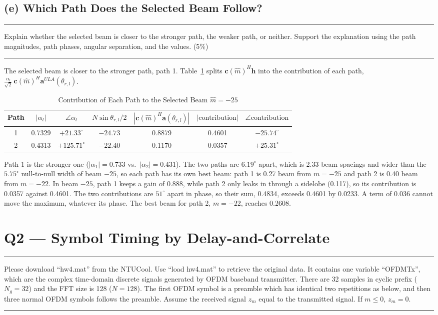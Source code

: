 \documentclass[12pt,a4paper]{report}
\newcommand{\question}[1]{%
    \hrule
    \vspace{0.2cm}
    #1
    \vspace{0.2cm}
    \hrule
    \vspace{0.5cm}
}
\begin{document}
\section{(e) Which Path Does the Selected Beam Follow?}

\question{Explain whether the selected beam is closer to the stronger path, the weaker path, or neither. Support the
explanation using the path magnitudes, path phases, angular separation, and the values. (5\%)}

The selected beam is closer to the stronger path, path 1. Table~\ref{tab:q1e} splits
$\mathbf{c}(\hat m)^H\mathbf{h}$ into the contribution of each path,
$\frac{\alpha_l}{\sqrt 2}\,\mathbf{c}(\hat m)^H\mathbf{a}^{ULA}(\theta_{r,l})$.

\begin{table}[H]
\centering
\caption{Contribution of Each Path to the Selected Beam $\hat m = -25$}
\label{tab:q1e}
\setlength{\tabcolsep}{7pt}
\renewcommand{\arraystretch}{1.2}
\begin{tabular}{ccccccc}
\toprule
Path & $|\alpha_l|$ & $\angle\alpha_l$ & $N\sin\theta_{r,l}/2$ & $|\mathbf{c}(\hat m)^H\mathbf{a}(\theta_{r,l})|$ &
$|\text{contribution}|$ & $\angle\text{contribution}$ \\
\midrule
1 & 0.7329 & $+21.33^\circ$ & $-24.73$ & 0.8879 & 0.4601 & $-25.74^\circ$ \\
2 & 0.4313 & $+125.71^\circ$ & $-22.40$ & 0.1170 & 0.0357 & $+25.31^\circ$ \\
\bottomrule
\end{tabular}
\end{table}

Path 1 is the stronger one ($|\alpha_1| = 0.733$ vs.\ $|\alpha_2| = 0.431$). The two paths are $6.19^\circ$ apart, which
is 2.33 beam spacings and wider than the $5.75^\circ$ null-to-null width of beam $-25$, so each path has its own best
beam: path 1 is 0.27 beam
from $m = -25$ and path 2 is 0.40 beam from $m = -22$. In beam $-25$, path 1 keeps a gain of 0.888, while path 2 only
leaks in through a sidelobe (0.117), so its contribution is 0.0357 against 0.4601. The two contributions are
$51^\circ$ apart in phase, so their sum, 0.4834, exceeds 0.4601 by 0.0233. A term of 0.036
cannot move the maximum, whatever its phase. The best beam for path 2, $m = -22$, reaches 0.2608.

\newpage

\chapter{Q2 — Symbol Timing by Delay-and-Correlate}
\question{Please download ``hw4.mat'' from the NTUCool. Use ``load hw4.mat'' to retrieve the original data. It contains
one variable ``OFDMTx'', which are the complex time-domain discrete signals generated by OFDM baseband transmitter.
There are 32 samples in cyclic prefix ($N_g = 32$) and the FFT size is 128 ($N = 128$). The first OFDM symbol is a
preamble which has identical two repetitions as below, and then three normal OFDM symbols follows the preamble. Assume
the received signal $z_m$ equal to the transmitted signal. If $m \le 0$, $z_m = 0$.}
\end{document}
